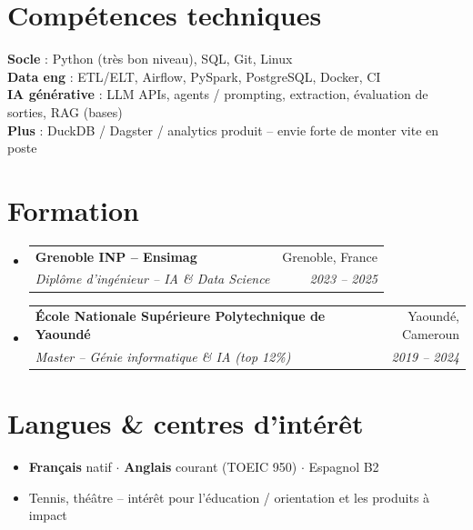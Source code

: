 \documentclass[a4paper,10.5pt]{article}
\makeatletter
\newcommand{\resumeSubheading}[4]{
  \vspace{3pt}\item
  \begin{tabular*}{0.97\textwidth}[t]{l@{\extracolsep{\fill}}r}
    \textbf{#1} & #2 \\
    \textit{\small #3} & \textit{\small #4} \\
  \end{tabular*}\vspace{1pt}
}
\newcommand{\resumeSubHeadingListStart}{\begin{itemize}[leftmargin=0.08in, label={}]}
\newcommand{\resumeSubHeadingListEnd}{\end{itemize}}
\makeatother
\begin{document}
\section{Comp\'etences techniques}
\begin{itemize}[leftmargin=0.08in, label={}]
  \small{\item{
    \textbf{Socle} : Python (tr\`es bon niveau), SQL, Git, Linux \\
    \textbf{Data eng} : ETL/ELT, Airflow, PySpark, PostgreSQL, Docker, CI \\
    \textbf{IA g\'en\'erative} : LLM APIs, agents / prompting, extraction, \'evaluation de sorties, RAG (bases) \\
    \textbf{Plus} : DuckDB / Dagster / analytics produit -- envie forte de monter vite en poste
  }}
\end{itemize}

\section{Formation}
\resumeSubHeadingListStart
  \resumeSubheading
    {Grenoble INP -- Ensimag}{Grenoble, France}
    {Dipl\^ome d'ing\'enieur -- IA \& Data Science}{2023 -- 2025}
  \resumeSubheading
    {\'Ecole Nationale Sup\'erieure Polytechnique de Yaound\'e}{Yaound\'e, Cameroun}
    {Master -- G\'enie informatique \& IA (top 12\%)}{2019 -- 2024}
\resumeSubHeadingListEnd

\section{Langues \& centres d'int\'er\^et}
\begin{itemize}[leftmargin=0.08in, label={}]
  \item \textbf{Fran\c{c}ais} natif $\cdot$ \textbf{Anglais} courant (TOEIC 950) $\cdot$ Espagnol B2
  \item Tennis, th\'e\^atre -- int\'er\^et pour l'\'education / orientation et les produits \`a impact
\end{itemize}
\end{document}
